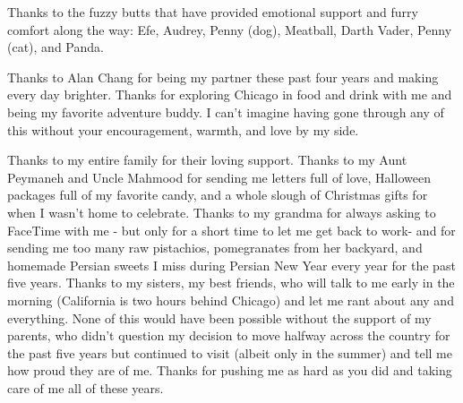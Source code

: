 Thanks to the fuzzy butts that have provided emotional support and furry comfort along the way: Efe, Audrey, Penny (dog), Meatball, Darth Vader, Penny (cat), and Panda.

Thanks to Alan Chang for being my partner these past four years and making every day brighter. Thanks for exploring Chicago in food and drink with me and being my favorite adventure buddy. I can't imagine having gone through any of this without your encouragement, warmth, and love by my side.

Thanks to my entire family for their loving support. Thanks to my Aunt Peymaneh and Uncle Mahmood for sending me letters full of love, Halloween packages full of my favorite candy, and a whole slough of Christmas gifts for when I wasn't home to celebrate. Thanks to my grandma for always asking to FaceTime with me - but only for a short time to let me get back to work- and for sending me too many raw pistachios, pomegranates from her backyard, and homemade Persian sweets I miss during Persian New Year every year for the past five years. Thanks to my sisters, my best friends, who will talk to me early in the morning (California is two hours behind Chicago) and let me rant about any and everything. None of this would have been possible without the support of my parents, who didn't question my decision to move halfway across the country for the past five years but continued to visit (albeit only in the summer) and tell me how proud they are of me. Thanks for pushing me as hard as you did and taking care of me all of these years. 
